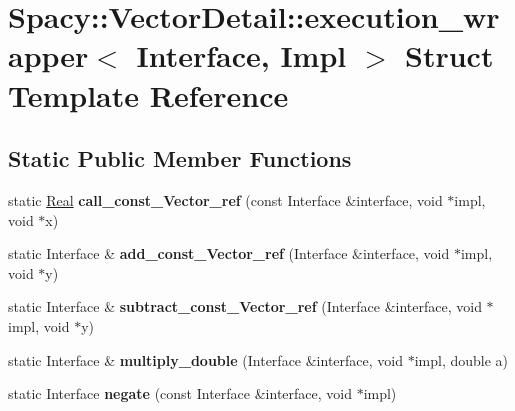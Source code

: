 \hypertarget{structSpacy_1_1VectorDetail_1_1execution__wrapper}{\section{\-Spacy\-:\-:\-Vector\-Detail\-:\-:execution\-\_\-wrapper$<$ \-Interface, \-Impl $>$ \-Struct \-Template \-Reference}
\label{structSpacy_1_1VectorDetail_1_1execution__wrapper}
}
\subsection*{\-Static \-Public \-Member \-Functions}
\begin{DoxyCompactItemize}
\item 
\hypertarget{structSpacy_1_1VectorDetail_1_1execution__wrapper_afe63a897d568e6d26b815a23aa60fa80}{static \hyperlink{classSpacy_1_1Real}{\-Real} {\bfseries call\-\_\-const\-\_\-\-Vector\-\_\-ref} (const \-Interface \&interface, void $\ast$impl, void $\ast$x)}\label{structSpacy_1_1VectorDetail_1_1execution__wrapper_afe63a897d568e6d26b815a23aa60fa80}

\item 
\hypertarget{structSpacy_1_1VectorDetail_1_1execution__wrapper_ad7b53e1dacca4b13948f779590e0e0f5}{static \-Interface \& {\bfseries add\-\_\-const\-\_\-\-Vector\-\_\-ref} (\-Interface \&interface, void $\ast$impl, void $\ast$y)}\label{structSpacy_1_1VectorDetail_1_1execution__wrapper_ad7b53e1dacca4b13948f779590e0e0f5}

\item 
\hypertarget{structSpacy_1_1VectorDetail_1_1execution__wrapper_a5b8eb00b74b8c509d75b0abc17eb7f08}{static \-Interface \& {\bfseries subtract\-\_\-const\-\_\-\-Vector\-\_\-ref} (\-Interface \&interface, void $\ast$impl, void $\ast$y)}\label{structSpacy_1_1VectorDetail_1_1execution__wrapper_a5b8eb00b74b8c509d75b0abc17eb7f08}

\item 
\hypertarget{structSpacy_1_1VectorDetail_1_1execution__wrapper_aab6658d8b927669fcd218043435d751d}{static \-Interface \& {\bfseries multiply\-\_\-double} (\-Interface \&interface, void $\ast$impl, double a)}\label{structSpacy_1_1VectorDetail_1_1execution__wrapper_aab6658d8b927669fcd218043435d751d}

\item 
\hypertarget{structSpacy_1_1VectorDetail_1_1execution__wrapper_a8512556890b11ce42b9b0c895f912368}{static \-Interface {\bfseries negate} (const \-Interface \&interface, void $\ast$impl)}\label{structSpacy_1_1VectorDetail_1_1execution__wrapper_a8512556890b11ce42b9b0c895f912368}


\end{DoxyCompactItemize}
